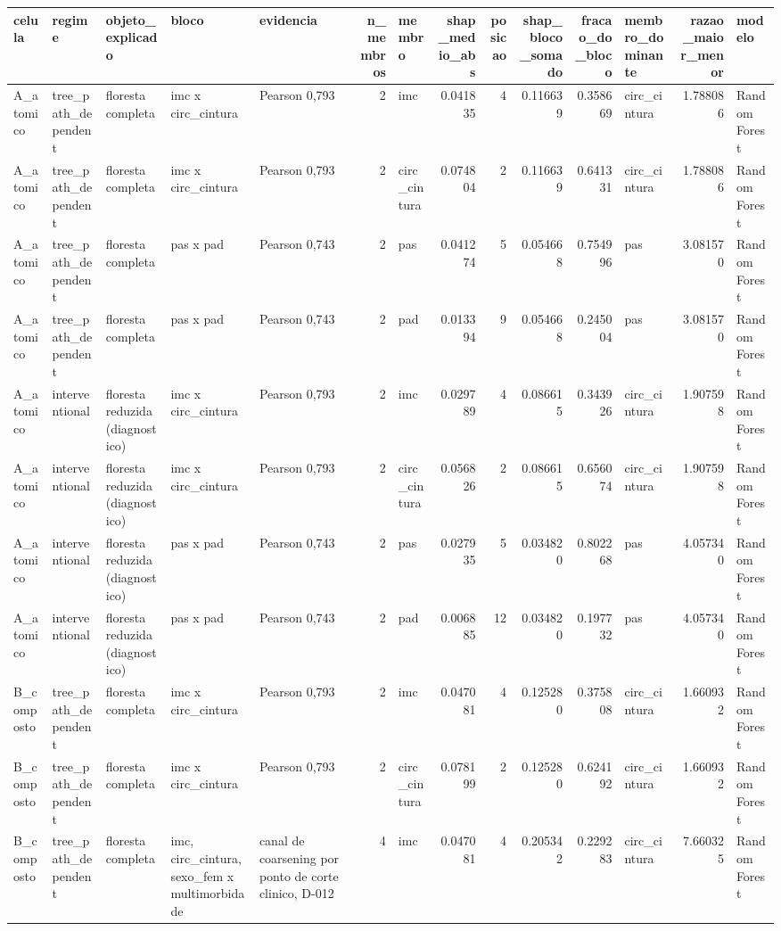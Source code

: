 \begin{tabular}{lllllrlrrrrlrl}
\toprule
celula & regime & objeto_explicado & bloco & evidencia & n_membros & membro & shap_medio_abs & posicao & shap_bloco_somado & fracao_do_bloco & membro_dominante & razao_maior_menor & modelo \\
\midrule
A_atomico & tree_path_dependent & floresta completa & imc x circ_cintura & Pearson 0,793 & 2 & imc & 0.041835 & 4 & 0.116639 & 0.358669 & circ_cintura & 1.788086 & Random Forest \\
A_atomico & tree_path_dependent & floresta completa & imc x circ_cintura & Pearson 0,793 & 2 & circ_cintura & 0.074804 & 2 & 0.116639 & 0.641331 & circ_cintura & 1.788086 & Random Forest \\
A_atomico & tree_path_dependent & floresta completa & pas x pad & Pearson 0,743 & 2 & pas & 0.041274 & 5 & 0.054668 & 0.754996 & pas & 3.081570 & Random Forest \\
A_atomico & tree_path_dependent & floresta completa & pas x pad & Pearson 0,743 & 2 & pad & 0.013394 & 9 & 0.054668 & 0.245004 & pas & 3.081570 & Random Forest \\
A_atomico & interventional & floresta reduzida (diagnostico) & imc x circ_cintura & Pearson 0,793 & 2 & imc & 0.029789 & 4 & 0.086615 & 0.343926 & circ_cintura & 1.907598 & Random Forest \\
A_atomico & interventional & floresta reduzida (diagnostico) & imc x circ_cintura & Pearson 0,793 & 2 & circ_cintura & 0.056826 & 2 & 0.086615 & 0.656074 & circ_cintura & 1.907598 & Random Forest \\
A_atomico & interventional & floresta reduzida (diagnostico) & pas x pad & Pearson 0,743 & 2 & pas & 0.027935 & 5 & 0.034820 & 0.802268 & pas & 4.057340 & Random Forest \\
A_atomico & interventional & floresta reduzida (diagnostico) & pas x pad & Pearson 0,743 & 2 & pad & 0.006885 & 12 & 0.034820 & 0.197732 & pas & 4.057340 & Random Forest \\
B_composto & tree_path_dependent & floresta completa & imc x circ_cintura & Pearson 0,793 & 2 & imc & 0.047081 & 4 & 0.125280 & 0.375808 & circ_cintura & 1.660932 & Random Forest \\
B_composto & tree_path_dependent & floresta completa & imc x circ_cintura & Pearson 0,793 & 2 & circ_cintura & 0.078199 & 2 & 0.125280 & 0.624192 & circ_cintura & 1.660932 & Random Forest \\
B_composto & tree_path_dependent & floresta completa & imc, circ_cintura, sexo_fem x multimorbidade & canal de coarsening por ponto de corte clinico, D-012 & 4 & imc & 0.047081 & 4 & 0.205342 & 0.229283 & circ_cintura & 7.660325 & Random Forest \\

\end{tabular}
